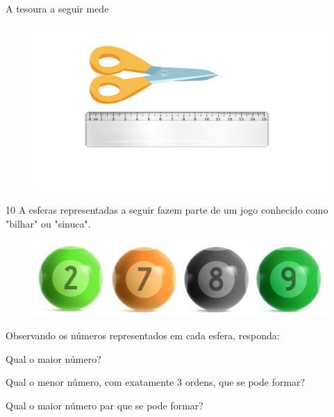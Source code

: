\begin{escolha}
\item A tesoura a seguir mede \reduline{10 cm}

\begin{figure}[htpb!]
\includegraphics[width=\textwidth]{../ilustracoes/MAT5/SAEB_5ANO_MAT_figura10.png}
\end{figure}

\end{escolha}


\num{10} A esferas representadas a seguir fazem parte de um jogo conhecido como
"bilhar" ou "sinuca".

\begin{figure}[htpb!]
\includegraphics[width=\textwidth]{../ilustracoes/MAT5/SAEB_5ANO_MAT_figura11.png}
\end{figure}

Observando os números representados em cada esfera, responda:

\begin{escolha}
\item  Qual o maior número?

\item  Qual o menor número, com exatamente 3 ordens, que se pode formar?

\item  Qual o maior número par que se pode formar?

\end{escolha}

